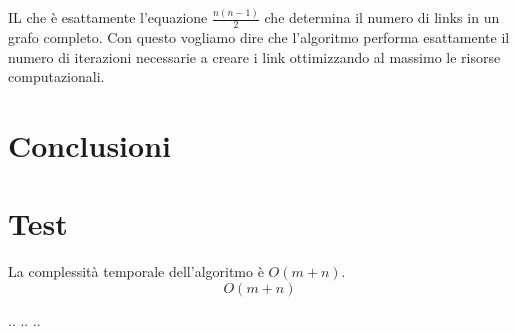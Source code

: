 \documentclass[binding=0.6cm]{sapthesis}
\begin{document}
IL che è esattamente l'equazione \(\frac{n(n-1)}{2}\) che determina il numero di links in un grafo completo. Con questo vogliamo dire che 
l'algoritmo performa esattamente il numero di iterazioni necessarie a creare i link ottimizzando al massimo le risorse computazionali.

\chapter{Conclusioni}
\chapter{Test}
La complessità temporale dell'algoritmo è $O(m+n)$.
\begin{equation}
    O(m+n)
\end{equation}

.. .. ..


\printbibliography

\backmatter
\cleardoublepage
{} %
\end{document}

